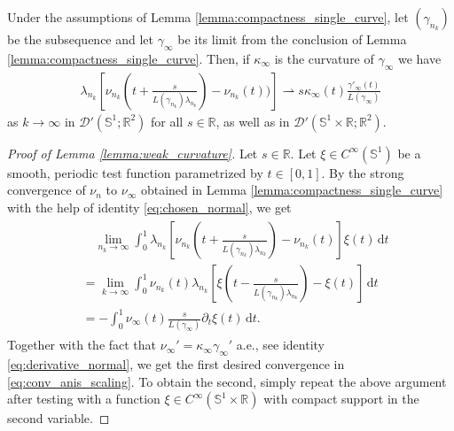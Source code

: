 \documentclass[10pt,a4paper]{amsart}
\newcommand{\R}{\mathbb R} 				%
\newcommand{\Sph}{{\mathbb S}}				%
\newcommand{\intd}{\, \mathrm{d}} 				%
\newcommand{\warr}{\rightharpoonup}				%
\begin{document}
\begin{lemma}\label{lemma:weak_curvature}
  Under the assumptions of Lemma
    \ref{lemma:compactness_single_curve}, let $(\gamma_{n_k})$ be the
    subsequence and let $\gamma_\infty$ be its limit from the
    conclusion of Lemma \ref{lemma:compactness_single_curve}. Then, if
    $\kappa_\infty$ is the curvature of $\gamma_\infty$ we have
        	\begin{align}\label{eq:conv_anis_scaling}
                  \lambda_{n_k} \left[
                  \nu_{n_k}\left(t+\frac{s}{L(\gamma_{n_k})
                  \lambda_{n_k}}\right) - 
                  \nu_{n_k}(t)) \right]\warr   s
                  \kappa_\infty(t)
                  \frac{\gamma'_\infty(t)}{L(\gamma_\infty)}
	\end{align}
        as $k \to \infty$ in $\mathcal D'(\Sph^1; \R^2)$ for all
        $s\in \R$, as well as in $\mathcal D'(\Sph^1\times \R; \R^2)$.
\end{lemma}

\begin{proof}[Proof of Lemma \ref{lemma:weak_curvature}]
  Let $s\in \R$.  Let $\xi \in C^\infty(\Sph^1)$ be a smooth, periodic
  test function parametrized by $t \in [0,1]$.  By the strong
  convergence of $\nu_n$ to $\nu_\infty$ obtained in Lemma
  \ref{lemma:compactness_single_curve} with the help of identity
    \eqref{eq:chosen_normal}, we get
	\begin{align}
	  \begin{split}
            & \quad \lim_{n_k \to \infty} \int_0^1 \lambda_{n_k}
            \left[ \nu_{n_k}\left(t+\frac{s}{L(\gamma_{n_k})
                  \lambda_{n_k}}\right) -
              \nu_{n_k}(t)\right] \xi (t)\intd t \\
            & = \lim_{k \to \infty} \int_0^1 \nu_{n_k}(t)
            \lambda_{n_k} \left[\xi\left(t-\frac{s}{L(\gamma_{n_k})
                  \lambda_{n_k} }\right)-
              \xi(t) \right]  \intd t\\
            & = - \int_0^1 \nu_\infty(t) \frac{s}{L(\gamma_\infty)}
            \partial_t \xi(t)\intd t.
	  \end{split}
	\end{align}
      Together with the fact that
      $ \nu_\infty' = \kappa_\infty \gamma_{\infty}'$ a.e., see
      identity \eqref{eq:derivative_normal}, we get the first desired
      convergence in \eqref{eq:conv_anis_scaling}.  To obtain the
      second, simply repeat the above argument after testing with a
      function $\xi \in C^\infty(\Sph^1\times \R)$ with compact
      support in the second variable.
\end{proof}
\end{document}
